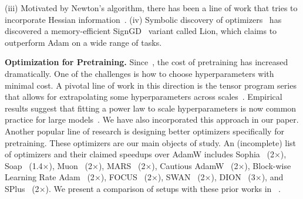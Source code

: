 (iii) Motivated by Newton's algorithm, there has been a line of work that tries to incorporate Hessian information~\cite{becker:improving,Yao_Gholami_Shen_Mustafa_Keutzer_Mahoney_2021,schaul2013peskylearningrates,Yao_Gholami_Shen_Mustafa_Keutzer_Mahoney_2021}. (iv) Symbolic discovery of optimizers~\cite{chen2023symbolic} has discovered a memory-efficient SignGD~\cite{pmlr-v80-bernstein18a} variant called Lion, which claims to outperform Adam on a wide range of tasks.

\textbf{Optimization for Pretraining.} Since~\cite{brown2020languagemodelsfewshotlearners}, the cost of pretraining has increased dramatically. One of the challenges is how to choose hyperparameters with minimal cost.  
A pivotal line of work in this direction is the tensor program series that allows for extrapolating some hyperparameters across scales~\cite{yang2020tensor,yang2020tensor2,yang2020scalinglimitswideneural,yang2021tensorprogramsiwide,yang2023tensorprogramsivbadaptive,yang2022tensorprogramsvtuning,yang2024spectralconditionfeaturelearning}. Empirical results suggest that fitting a power law to scale hyperparameters is now common practice for large models~\cite{li2025predictablescalei,everett2024scalingexponentsparameterizationsoptimizers,liu2025muonscalablellmtraining,deepseekai2024deepseekllmscalingopensource,zhang2025doescriticalbatchsize}. We have also incorporated this approach in our paper. 
Another popular line of research is designing better optimizers specifically for pretraining. These optimizers are our main objects of study. An (incomplete) list of optimizers and their claimed speedups over AdamW includes Sophia~\cite{liu2024sophiascalablestochasticsecondorder} (2$\times$), Soap~\cite{vyas2025soapimprovingstabilizingshampoo} (1.4$\times$), Muon~\cite{jordan2024muon,liu2025muonscalablellmtraining} (2$\times$), MARS~\cite{yuan2025mars} (2$\times$), Cautious AdamW~\cite{liang2025cautious} (2$\times$), Block-wise Learning Rate Adam~\cite{wang2025sharpnessdisparityprincipletransformers} (2$\times$), FOCUS~\cite{liu2025focusorderconcentratedupdating} (2$\times$), SWAN~\cite{ma2025swansgdnormalizationwhitening} (2$\times$), DION~\cite{ahn2025diondistributedorthonormalizedupdates} (3$\times$), and SPlus~\cite{frans2025stablewhiteningoptimizerefficient} (2$\times$). We present a comparison of setups with these prior works in ~.

